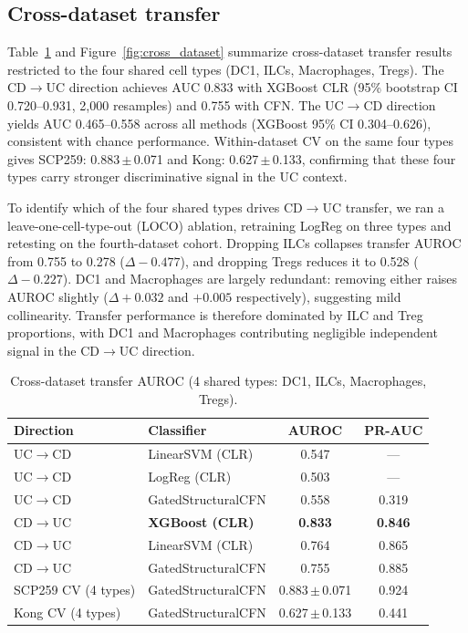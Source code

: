 \documentclass[11pt,letterpaper]{article}
\begin{document}
\subsection{Cross-dataset transfer}

Table~\ref{tab:transfer} and Figure~\ref{fig:cross_dataset} summarize cross-dataset transfer results restricted to
the four shared cell types (DC1, ILCs, Macrophages, Tregs). The
CD$\rightarrow$UC direction achieves AUC 0.833 with XGBoost CLR (95\% bootstrap CI 0.720--0.931, 2{,}000 resamples) and 0.755
with CFN. The UC$\rightarrow$CD direction yields AUC 0.465--0.558 across all
methods (XGBoost 95\% CI 0.304--0.626), consistent with chance performance. Within-dataset CV on the same
four types gives SCP259: 0.883\,$\pm$\,0.071 and Kong: 0.627\,$\pm$\,0.133,
confirming that these four types carry stronger discriminative signal in the UC
context.

To identify which of the four shared types drives CD$\rightarrow$UC transfer, we
ran a leave-one-cell-type-out (LOCO) ablation, retraining LogReg on three types
and retesting on the fourth-dataset cohort. Dropping ILCs collapses transfer
AUROC from 0.755 to 0.278 ($\Delta -0.477$), and dropping Tregs reduces it to
0.528 ($\Delta -0.227$). DC1 and Macrophages are largely redundant: removing
either raises AUROC slightly ($\Delta +0.032$ and $+0.005$ respectively),
suggesting mild collinearity. Transfer performance is therefore dominated by
ILC and Treg proportions, with DC1 and Macrophages contributing negligible
independent signal in the CD$\rightarrow$UC direction.

\begin{table}[H]
\centering
\caption{Cross-dataset transfer AUROC (4 shared types: DC1, ILCs, Macrophages, Tregs).}
\label{tab:transfer}
\small
\begin{tabular}{llcc}
\toprule
\textbf{Direction} & \textbf{Classifier} & \textbf{AUROC} & \textbf{PR-AUC} \\
\midrule
UC$\rightarrow$CD & LinearSVM (CLR) & 0.547 & --- \\
UC$\rightarrow$CD & LogReg (CLR)    & 0.503 & --- \\
UC$\rightarrow$CD & GatedStructuralCFN & 0.558 & 0.319 \\
\midrule
CD$\rightarrow$UC & \textbf{XGBoost (CLR)} & \textbf{0.833} & \textbf{0.846} \\
CD$\rightarrow$UC & LinearSVM (CLR) & 0.764 & 0.865 \\
CD$\rightarrow$UC & GatedStructuralCFN & 0.755 & 0.885 \\
\midrule
SCP259 CV (4 types) & GatedStructuralCFN & 0.883\,$\pm$\,0.071 & 0.924 \\
Kong CV (4 types)   & GatedStructuralCFN & 0.627\,$\pm$\,0.133 & 0.441 \\
\bottomrule
\end{tabular}
\end{table}
\end{document}
